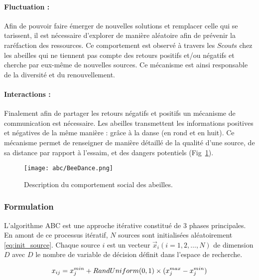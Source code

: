 \paragraph{Fluctuation :} %
\label{par:fluctuation}
Afin de pouvoir faire émerger de nouvelles solutions et remplacer celle qui se
tarissent, il est nécessaire d’explorer de manière aléatoire afin de prévenir la
raréfaction des ressources. Ce comportement est observé
à travers les $Scout$s chez les abeilles qui ne tiennent pas compte des retours positifs
et/ou négatifs et cherche par eux-même de nouvelles sources. Ce mécanisme est ainsi
responsable de la diversité et du renouvellement.

\paragraph{Interactions :} %
\label{par:intractions}
Finalement afin de partager les retours négatifs et positifs un mécanisme de communication
est nécessaire.
Les abeilles transmettent les informations positives et négatives de la même
manière : grâce à la danse (en rond et en huit).
Ce mécanisme permet de renseigner de manière détaillé de la qualité
d’une source, de sa distance par rapport à l’essaim, et des dangers potentiels
(Fig~\ref{fig:bee_dance}).

\begin{figure}
    \begin{center}
        \texttt{[image: abc/BeeDance.png]}
    \end{center}
    \caption{Description du comportement social des abeilles.
             \label{fig:bee_dance}}
\end{figure}
\FloatBarrier


\subsubsection{Formulation} %
\label{ssub:formulation}
L’algorithme ABC est une approche itérative constitué de 3 phases principales.
En amont de ce processus itératif, $N$ sources sont initialisées aléatoirement \eqref{eq:init_source}.
Chaque source $i$ est un vecteur $\vec{x}_{i}(i = 1, 2, \dotsc, N)$ de dimension $D$
avec $D$ le nombre de variable de décision définit dans l’espace de recherche.

\begin{equation}\label{eq:init_source}
  x_{ij} = x_{j}^{min} + RandUniform(0, 1) \times (x_{j}^{max} - x_{j}^{min}) \\
\end{equation}

